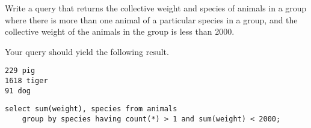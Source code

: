 \begin{blocksection}
\question Write a query that returns the collective weight and species of animals in a group where there is more than one animal of a particular species in a group, and the collective weight of the animals in the group is less than 2000.

Your query should yield the following result.

\begin{lstlisting}
229 pig
1618 tiger
91 dog
\end{lstlisting}

\begin{solution}[1.5in]
\begin{lstlisting}
select sum(weight), species from animals
    group by species having count(*) > 1 and sum(weight) < 2000;
\end{lstlisting}
\end{solution}
\end{blocksection}
